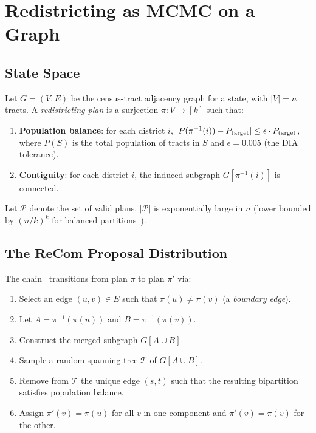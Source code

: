 \section{Redistricting as MCMC on a Graph}
\label{sec:mcmc}

\subsection{State Space}

Let $G = (V, E)$ be the census-tract adjacency graph for a state, with
$|V| = n$ tracts.
A \emph{redistricting plan} is a surjection $\pi : V \to [k]$ such that:
\begin{enumerate}
\item \textbf{Population balance}: for each district $i$,
      $|P(\pi^{-1}(i)) - P_{\rm target}| \leq \epsilon \cdot P_{\rm target}$,
      where $P(S)$ is the total population of tracts in $S$ and
      $\epsilon = 0.005$ (the DIA tolerance).
\item \textbf{Contiguity}: for each district $i$, the induced subgraph
      $G[\pi^{-1}(i)]$ is connected.
\end{enumerate}

Let $\mathcal{P}$ denote the set of valid plans.
$|\mathcal{P}|$ is exponentially large in $n$ (lower bounded by
$(n/k)^k$ for balanced partitions~\citep{duchindist2020}).

\subsection{The ReCom Proposal Distribution}

The \recom{} chain~\citep{deford2021} transitions from plan $\pi$ to
plan $\pi'$ via:
\begin{enumerate}
\item Select an edge $(u, v) \in E$ such that $\pi(u) \neq \pi(v)$
      (a \emph{boundary edge}).
\item Let $A = \pi^{-1}(\pi(u))$ and $B = \pi^{-1}(\pi(v))$.
\item Construct the merged subgraph $G[A \cup B]$.
\item Sample a random spanning tree $\mathcal{T}$ of $G[A \cup B]$.
\item Remove from $\mathcal{T}$ the unique edge $(s, t)$ such that the
      resulting bipartition satisfies population balance.
\item Assign $\pi'(v) = \pi(u)$ for all $v$ in one component and
      $\pi'(v) = \pi(v)$ for the other.
\end{enumerate}

